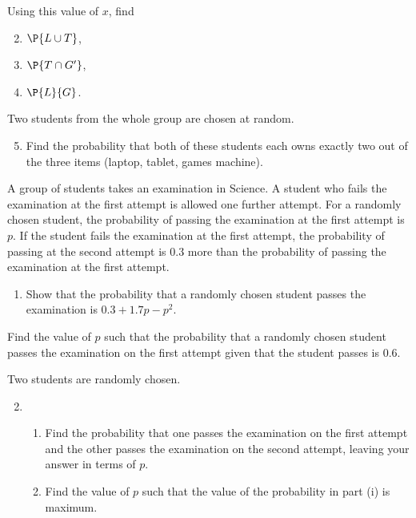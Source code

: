 \begin{problem}
    Using this value of $x$, find
    \begin{enumerate}
        \setcounter{enumi}{1}
        \item $\P{L \cup T}$,
        \item $\P{T \cap G'}$,
        \item $\P{L}{G}$.
    \end{enumerate}

    Two students from the whole group are chosen at random.
    
    \begin{enumerate}
        \setcounter{enumi}{4}
        \item Find the probability that both of these students each owns exactly two out of the three items (laptop, tablet, games machine).
    \end{enumerate}
\end{problem}

\begin{problem}
    A group of students takes an examination in Science. A student who fails the examination at the first attempt is allowed one further attempt. For a randomly chosen student, the probability of passing the examination at the first attempt is $p$. If the student fails the examination at the first attempt, the probability of passing at the second attempt is $0.3$ more than the probability of passing the examination at the first attempt.

    \begin{enumerate}
        \item Show that the probability that a randomly chosen student passes the examination is $0.3 + 1.7p - p^2$.
    \end{enumerate}

    Find the value of $p$ such that the probability that a randomly chosen student passes the examination on the first attempt given that the student passes is $0.6$.

    Two students are randomly chosen.

    \begin{enumerate}
        \setcounter{enumi}{1}
        \item \begin{enumerate}
            \item Find the probability that one passes the examination on the first attempt and the other passes the examination on the second attempt, leaving your answer in terms of $p$.
            \item Find the value of $p$ such that the value of the probability in part (i) is maximum.
        \end{enumerate}
    \end{enumerate}
\end{problem}

